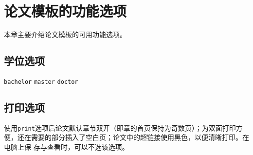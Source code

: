 

\chapter{\texorpdfstring{\XeLaTeX{}}{XeLaTeX}%
          论文模板的功能选项}
\label{cha:options}

本章主要介绍论文模板的可用功能选项。

\section{学位选项}
\label{sec:degree}

\texttt{bachelor}
\texttt{master}
\texttt{doctor}

\section{打印选项}
\label{sec:print}

使用\texttt{print}选项后论文默认章节双开（即章的首页保持为奇数页）；为双面打印方
便，还在需要的部分插入了空白页；论文中的超链接使用黑色，以便清晰打印。在电脑上保
存与查看时，可以不选该选项。


